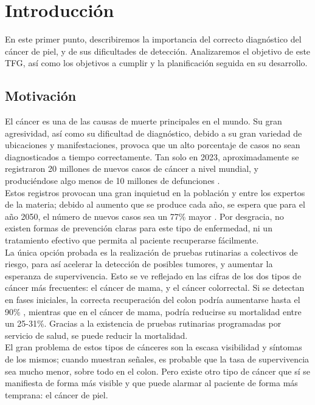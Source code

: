 \chapter{Introducción}

En este primer punto, describiremos la importancia del correcto diagnóstico del cáncer de piel, y de sus dificultades de detección. Analizaremos el objetivo de este TFG, así como los objetivos a cumplir y la planificación seguida en su desarrollo.

\section{Motivación}

El cáncer es una de las causas de muerte principales en el mundo. Su gran agresividad, así como su dificultad de diagnóstico, debido a su gran variedad de ubicaciones y manifestaciones, provoca que un alto porcentaje de casos no sean diagnosticados a tiempo correctamente. Tan solo en 2023, aproximadamente se registraron 20 millones de nuevos casos de cáncer a nivel mundial, y produciéndose algo menos de 10 millones de defunciones \cite{cancerincidence}.\\

Estos registros provocan una gran inquietud en la población y entre los expertos de la materia; debido al aumento que se produce cada año, se espera que para el año 2050, el número de nuevos casos sea un 77\% mayor \cite{cancerprevision}.  Por desgracia, no existen formas de prevención claras para este tipo de enfermedad, ni un tratamiento efectivo que permita al paciente recuperarse fácilmente. \\

La única opción probada es la realización de pruebas rutinarias a colectivos de riesgo, para así acelerar la detección de posibles tumores, y aumentar la esperanza de supervivencia. Esto se ve reflejado en las cifras de los dos tipos de cáncer más frecuentes: el cáncer de mama, y el cáncer colorrectal. Si se detectan en fases iniciales, la correcta recuperación del colon podría aumentarse hasta el 90\% \cite{coloncancer}, mientras que en el cáncer de mama, podría reducirse su mortalidad entre un 25-31\%. Gracias a la existencia de pruebas rutinarias programadas por servicio de salud, se puede reducir la mortalidad.\\

El gran problema de estos tipos de cánceres son la escasa visibilidad y síntomas de los mismos; cuando muestran señales, es probable que la tasa de supervivencia sea mucho menor, sobre todo en el colon. Pero existe otro tipo de cáncer que sí se manifiesta de forma más visible y que puede alarmar al paciente de forma más temprana: el cáncer de piel.\\

